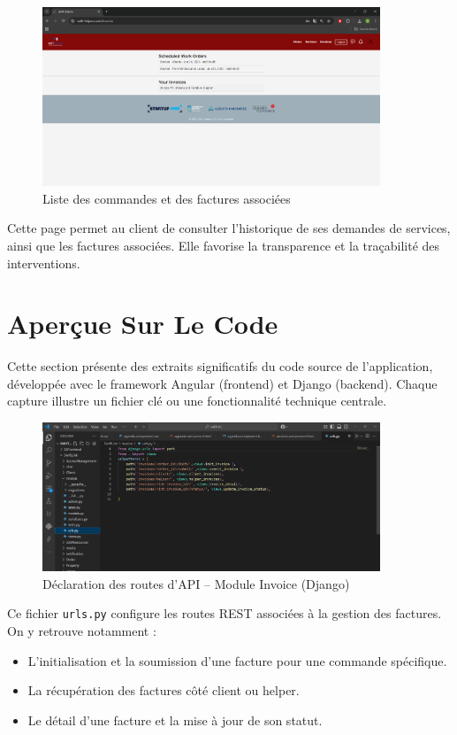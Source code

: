 \vspace{0.5cm}

\begin{figure}[H]
    \centering
    \includegraphics[width=0.9\textwidth]{figures/facture client.png}
    \caption{Liste des commandes et des factures associées}
\end{figure}

\noindent
Cette page permet au client de consulter l’historique de ses demandes de services, ainsi que les factures associées. Elle favorise la transparence et la traçabilité des interventions.

\section{Aperçue Sur Le Code}

Cette section présente des extraits significatifs du code source de l'application, développée avec le framework Angular (frontend) et Django (backend). Chaque capture illustre un fichier clé ou une fonctionnalité technique centrale.

\begin{figure}[H]
    \centering
    \includegraphics[width=0.9\textwidth]{figures/urls.png}
    \caption{Déclaration des routes d'API – Module Invoice (Django)}
\end{figure}

\noindent
Ce fichier \texttt{urls.py} configure les routes REST associées à la gestion des factures. On y retrouve notamment :
\begin{itemize}
    \item L'initialisation et la soumission d'une facture pour une commande spécifique.
    \item La récupération des factures côté client ou helper.
    \item Le détail d'une facture et la mise à jour de son statut.
\end{itemize}

